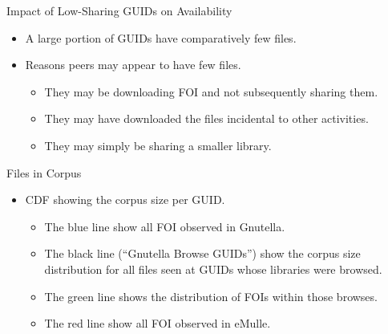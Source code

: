 \documentclass[notes]{beamer}
\begin{document}
\begin{frame}
\begin{block}{Impact of Low-Sharing GUIDs on Availability}
\begin{itemize}
\item[\checkmark] A large portion of GUIDs have comparatively few files. 
\item[\checkmark] Reasons peers may appear to have few files.
\begin{itemize}
\item They may be downloading FOI and not subsequently sharing them.
\item They may have downloaded the files incidental to other activities.
\item They may simply be sharing a smaller library.
\end{itemize}

\end{itemize}
\end{block}
\end{frame}
\begin{frame}
\begin{block}{Files in Corpus}
\begin{itemize}
\item[\checkmark] CDF showing the corpus size per GUID.
\begin{itemize}
\item The blue line show all FOI observed in Gnutella.
\item The black line (“Gnutella Browse GUIDs”) show the corpus size distribution for all files seen at GUIDs whose libraries were browsed.
\item The green line shows the distribution of FOIs within those browses.
\item The red line show all FOI observed in eMulle.
\end{itemize}
\end{itemize}

\end{block}
\end{frame}
\end{document}
